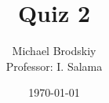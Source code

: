


\title{Quiz 2}
\date{\today}
\author{Michael Brodskiy\\ \small Professor: I. Salama}



\maketitle

